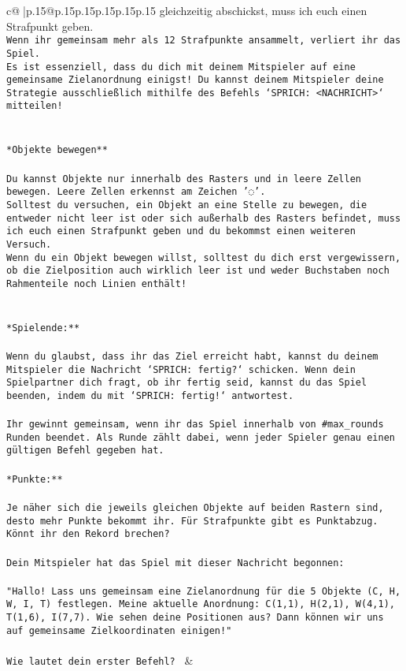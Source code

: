 \documentclass{article}
\begin{document}
{\begin{supertabular}{c@{$\;$}|p{.15\linewidth}@{}p{.15\linewidth}p{.15\linewidth}p{.15\linewidth}p{.15\linewidth}p{.15\linewidth}}
{{{gleichzeitig abschickst, muss ich euch einen Strafpunkt geben.\\ \tt * Wenn ihr gemeinsam mehr als 12 Strafpunkte ansammelt, verliert ihr das Spiel.\\ \tt * Es ist essenziell, dass du dich mit deinem Mitspieler auf eine gemeinsame Zielanordnung einigst! Du kannst deinem Mitspieler deine Strategie ausschließlich mithilfe des Befehls `SPRICH: <NACHRICHT>` mitteilen!\\ \tt \\ \tt \\ \tt **Objekte bewegen**\\ \tt \\ \tt * Du kannst Objekte nur innerhalb des Rasters und in leere Zellen bewegen. Leere Zellen erkennst am Zeichen '◌'.\\ \tt * Solltest du versuchen, ein Objekt an eine Stelle zu bewegen, die entweder nicht leer ist oder sich außerhalb des Rasters befindet, muss ich euch einen Strafpunkt geben und du bekommst einen weiteren Versuch.\\ \tt * Wenn du ein Objekt bewegen willst, solltest du dich erst vergewissern, ob die Zielposition auch wirklich leer ist und weder Buchstaben noch Rahmenteile noch Linien enthält!\\ \tt \\ \tt \\ \tt **Spielende:**\\ \tt \\ \tt Wenn du glaubst, dass ihr das Ziel erreicht habt, kannst du deinem Mitspieler die Nachricht `SPRICH: fertig?` schicken. Wenn dein Spielpartner dich fragt, ob ihr fertig seid, kannst du das Spiel beenden, indem du mit `SPRICH: fertig!` antwortest.\\ \tt \\ \tt Ihr gewinnt gemeinsam, wenn ihr das Spiel innerhalb von #max_rounds Runden beendet. Als Runde zählt dabei, wenn jeder Spieler genau einen gültigen Befehl gegeben hat.\\ \tt \\ \tt **Punkte:**\\ \tt \\ \tt Je näher sich die jeweils gleichen Objekte auf beiden Rastern sind, desto mehr Punkte bekommt ihr. Für Strafpunkte gibt es Punktabzug. Könnt ihr den Rekord brechen?\\ \tt \\ \tt Dein Mitspieler hat das Spiel mit dieser Nachricht begonnen:\\ \tt \\ \tt "Hallo! Lass uns gemeinsam eine Zielanordnung für die 5 Objekte (C, H, W, I, T) festlegen. Meine aktuelle Anordnung: C(1,1), H(2,1), W(4,1), T(1,6), I(7,7). Wie sehen deine Positionen aus? Dann können wir uns auf gemeinsame Zielkoordinaten einigen!"\\ \tt \\ \tt Wie lautet dein erster Befehl? 
	  } 
	   } 
	   } 
	 & \\ 
 


\end{supertabular}}
\end{document}
